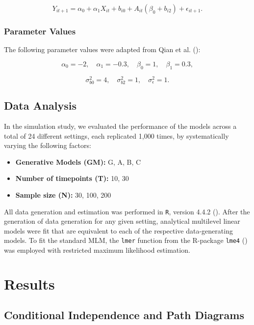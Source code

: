 \documentclass[
  11pt,
  a4paper,
]{article}
\begin{document}
\[
Y_{it+1} = \alpha_0 + \alpha_1 X_{it} + b_{i0} + A_{it} (\beta_0 + b_{i2}) + \epsilon_{it+1}.
\]

\subsubsection{Parameter Values}\label{parameter-values}

The following parameter values were adapted from Qian et al.
():

\[
\alpha_0 = -2, \quad \alpha_1 = -0.3, \quad \beta_0 = 1, \quad \beta_1 = 0.3,
\]

\[
\sigma_{b0}^2 = 4, \quad \sigma_{b2}^2 = 1, \quad \sigma_\epsilon^2 = 1.
\]

\subsection{Data Analysis}\label{data-analysis}

In the simulation study, we evaluated the performance of the models
across a total of 24 different settings, each replicated 1,000 times, by
systematically varying the following factors:

\begin{itemize}
\item
  \textbf{Generative Models (GM):} G, A, B, C
\item
  \textbf{Number of timepoints (T):} 10, 30
\item
  \textbf{Sample size (N):} 30, 100, 200
\end{itemize}

All data generation and estimation was performed in \texttt{R}, version
4.4.2 (). After the generation
of data generation for any given setting, analytical multilevel linear
models were fit that are equivalent to each of the respective
data-generating models. To fit the standard MLM, the \texttt{lmer}
function from the R-package \texttt{lme4}
() was employed with
restricted maximum likelihood estimation.

\section{Results}\label{results}

\subsection{Conditional Independence and Path
Diagrams}\label{conditional-independence-and-path-diagrams}
\end{document}
